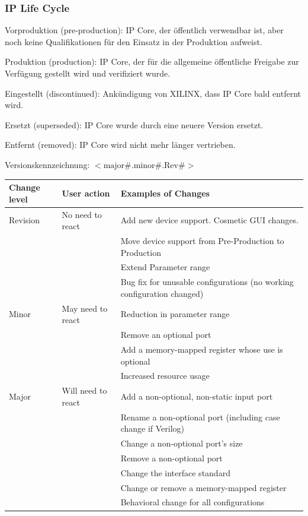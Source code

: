 \subsubsection{IP Life Cycle}
\begin{compactitem}
        \item Vorproduktion (pre-production): IP Core, der öffentlich verwendbar ist, aber noch keine Qualifikationen für den Einsatz in der Produktion aufweist.
        \item Produktion (production): IP Core, der für die allgemeine öffentliche Freigabe zur Verfügung gestellt wird und verifiziert wurde.
        \item Eingestellt (discontinued): Ankündigung von XILINX, dass IP Core bald entfernt wird.
        \item Ersetzt (superseded): IP Core wurde durch eine neuere Version ersetzt.
        \item Entfernt (removed): IP Core wird nicht mehr länger vertrieben.
\end{compactitem}
Versionskennzeichnung: $<\text{major}\#.\text{minor}\#.\text{Rev}\#>$\\
\begin{tabular}{| l | l | l |}
\hline
\textbf{Change level} & \textbf{User action} & Examples of Changes\\
\hline
Revision & No need to react & Add new device support. Cosmetic GUI changes.\\
 & & Move device support from Pre-Production to Production\\
 & & Extend Parameter range\\
 & & Bug fix for unusable configurations (no working configuration changed)\\
\hline
Minor & May need to react & Reduction in parameter range\\
 & & Remove an optional port\\
 & & Add a memory-mapped register whose use is optional\\
 & & Increased resource usage\\
\hline
Major & Will need to react & Add a non-optional, non-static input port\\
 & & Rename a non-optional port (including case change if Verilog)\\
 & & Change a non-optional port's size\\
 & & Remove a non-optional port\\
 & & Change the interface standard\\
 & & Change or remove a memory-mapped register\\
 & & Behavioral change for all configurations\\
\hline
\end{tabular}
